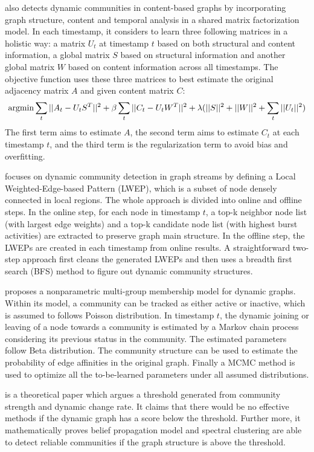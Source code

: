 \cite{appel2018temporally} also detects dynamic communities in content-based graphs by incorporating graph structure, content and temporal analysis in a shared matrix factorization model. In each timestamp, it considers to learn three following matrices in a holistic way: a matrix $U_t$ at timestamp $t$ based on both structural and content information, a global  matrix $S$ based on structural information and another global matrix $W$ based on content information across all timestamps. The objective function uses these three matrices to best estimate the original adjacency matrix $A$ and given content matrix $C$:
\begin{equation}
\operatorname*{argmin} \sum_{t}||A_t-U_tS^T||^2 + \beta\sum_{t}||C_t-U_tW^T||^2 + \lambda(||S||^2+||W||^2+\sum_t||U_t||^2)
\end{equation}
The first  term aims to estimate $A$, the second term aims to estimate $C_t$ at each timestamp $t$, and the third term is the regularization term  to avoid bias and overfitting.

\cite{wang2013dynamic} focuses on dynamic community detection in graph streams by defining a Local Weighted-Edge-based Pattern (LWEP), which is a subset of node densely connected in local regions. The whole approach is divided into online and offline steps. In the online step, for each node in timestamp $t$, a top-k neighbor node list (with largest edge weights) and a top-k candidate node list (with highest burst activities) are extracted to preserve graph main structure. In the offline step, the LWEPs are created in each timestamp from online results. A straightforward two-step approach first cleans the generated LWEPs and then uses a breadth first search (BFS) method to figure out dynamic community structures.  

\cite{kim2013nonparametric} proposes a nonparametric multi-group membership model for dynamic graphs. Within its model, a community can be tracked as either active or inactive, which is assumed to follows Poisson distribution. In timestamp $t$, the dynamic joining or leaving of a node towards a community is estimated by a Markov chain process considering its previous status in the community. The estimated parameters follow Beta distribution. The community structure can be used to estimate the probability of edge affinities in the original graph. Finally a MCMC method is used to optimize all the to-be-learned parameters under all assumed distributions.

\cite{ghasemian2016detectability} is a theoretical paper which argues a threshold generated from community strength and dynamic change rate. It claims that there would be no effective methods if the dynamic graph has a score below the threshold. Further more, it mathematically proves belief propagation model and spectral clustering are able to detect reliable communities if the graph structure is above the threshold.  

